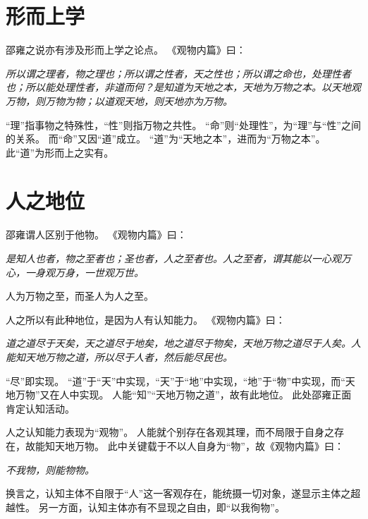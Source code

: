 \documentclass[11pt]{article}
\begin{document}
\section{形而上学}
邵雍之说亦有涉及形而上学之论点。
《观物内篇》曰：

\textit{所以谓之理者，物之理也；所以谓之性者，天之性也；所以谓之命也，处理性者也；所以能处理性者，非道而何？是知道为天地之本，天地为万物之本。以天地观万物，则万物为物；以道观天地，则天地亦为万物。}

“理”指事物之特殊性，“性”则指万物之共性。
“命”则“处理性”，为“理”与“性”之间的关系。
而“命”又因“道”成立。
“道”为“天地之本”，进而为“万物之本”。
此“道”为形而上之实有。

\section{人之地位}
邵雍谓人区别于他物。
《观物内篇》曰：

\textit{是知人也者，物之至者也；圣也者，人之至者也。人之至者，谓其能以一心观万心，一身观万身，一世观万世。}

人为万物之至，而圣人为人之至。

\newline

人之所以有此种地位，是因为人有认知能力。
《观物内篇》曰：

\textit{道之道尽于天矣，天之道尽于地矣，地之道尽于物矣，天地万物之道尽于人矣。人能知天地万物之道，所以尽于人者，然后能尽民也。}

“尽”即实现。
“道”于“天”中实现，“天”于“地”中实现，“地”于“物”中实现，而“天地万物”又在人中实现。
人能“知”“天地万物之道”，故有此地位。
此处邵雍正面肯定认知活动。

\newline

人之认知能力表现为“观物”。
人能就个别存在各观其理，而不局限于自身之存在，故能知天地万物。
此中关键载于不以人自身为“物”，故《观物内篇》曰：

\textit{不我物，则能物物。}

换言之，认知主体不自限于“人”这一客观存在，能统摄一切对象，遂显示主体之超越性。
另一方面，认知主体亦有不显现之自由，即“以我徇物”。
\end{document}
